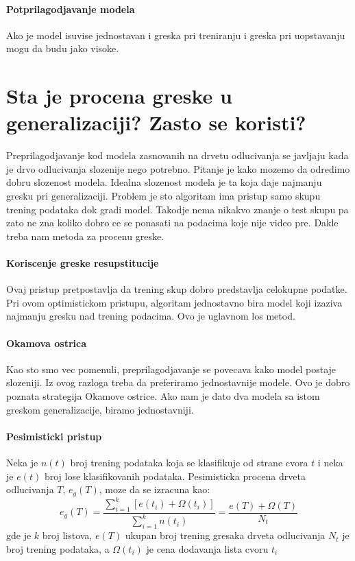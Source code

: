 \documentclass[a4paper]{article}
\begin{document}
\paragraph{Potprilagodjavanje modela} Ako je model isuvise jednostavan i greska pri treniranju i
greska pri uopstavanju mogu da budu jako visoke.

\section{Sta je procena greske u generalizaciji? Zasto se koristi?}
Preprilagodjavanje kod modela zasnovanih na drvetu odlucivanja se javljaju kada je drvo odlucivanja
slozenije nego potrebno. Pitanje je kako mozemo da odredimo dobru slozenost modela. Idealna
slozenost modela je ta koja daje najmanju gresku pri generalizaciji. Problem je sto algoritam ima
pristup samo skupu trening podataka dok gradi model. Takodje nema nikakvo znanje o test skupu pa
zato ne zna koliko dobro ce se ponasati na podacima koje nije video pre. Dakle treba nam metoda za
procenu greske.
\paragraph{Koriscenje greske resupstitucije} Ovaj pristup pretpostavlja da trening skup dobro
predstavlja celokupne podatke. Pri ovom optimistickom pristupu, algoritam jednostavno bira model
koji izaziva najmanju gresku nad trening podacima. Ovo je uglavnom los metod.

\paragraph{Okamova ostrica} Kao sto smo vec pomenuli, preprilagodjavanje se povecava kako model
postaje slozeniji. Iz ovog razloga treba da preferiramo jednostavnije modele. Ovo je dobro poznata
strategija Okamove ostrice. Ako nam je dato dva modela sa istom greskom generalizacije, biramo
jednostavniji.

\paragraph{Pesimisticki pristup} Neka je \(n(t)\) broj trening podataka koja se klasifikuje od
strane cvora \(t\) i neka je \(e(t)\) broj lose klasifikovanih podataka. Pesimisticka procena drveta
odlucivanja \(T\), \(e_g(T)\), moze da se izracuna kao:
\[
    e_g(T) = \dfrac{\sum_{i=1}^{k}[e(t_i)+\Omega(t_i)]}{\sum_{i=1}^{k}n(t_i)}
        = \dfrac{e(T) + \Omega(T)}{N_t}
\]
gde je \(k\) broj listova, \(e(T)\) ukupan broj trening gresaka drveta odlucivanja \(N_t\) je broj
trening podataka, a \(\Omega(t_i)\) je cena dodavanja lista cvoru \(t_i\)
\end{document}
